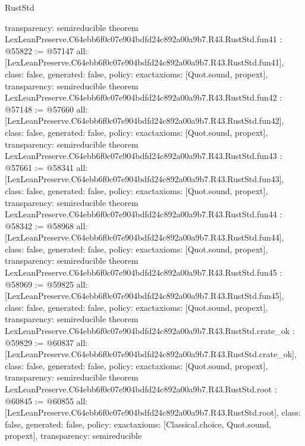\begin{lexlean}{RustStd}
\begin{coremodule}
{  transparency: semireducible
}
theorem LexLeanPreserve.C64ebb6f0c07e904bdfd24c892a00a9b7.R43.RustStd.fun41 : @55822 := @57147 {
  all: [LexLeanPreserve.C64ebb6f0c07e904bdfd24c892a00a9b7.R43.RustStd.fun41],
  class: false,
  generated: false,
  policy: exact{axioms: [Quot.sound, propext]},
  transparency: semireducible
}
theorem LexLeanPreserve.C64ebb6f0c07e904bdfd24c892a00a9b7.R43.RustStd.fun42 : @57148 := @57660 {
  all: [LexLeanPreserve.C64ebb6f0c07e904bdfd24c892a00a9b7.R43.RustStd.fun42],
  class: false,
  generated: false,
  policy: exact{axioms: [Quot.sound, propext]},
  transparency: semireducible
}
theorem LexLeanPreserve.C64ebb6f0c07e904bdfd24c892a00a9b7.R43.RustStd.fun43 : @57661 := @58341 {
  all: [LexLeanPreserve.C64ebb6f0c07e904bdfd24c892a00a9b7.R43.RustStd.fun43],
  class: false,
  generated: false,
  policy: exact{axioms: [Quot.sound, propext]},
  transparency: semireducible
}
theorem LexLeanPreserve.C64ebb6f0c07e904bdfd24c892a00a9b7.R43.RustStd.fun44 : @58342 := @58968 {
  all: [LexLeanPreserve.C64ebb6f0c07e904bdfd24c892a00a9b7.R43.RustStd.fun44],
  class: false,
  generated: false,
  policy: exact{axioms: [Quot.sound, propext]},
  transparency: semireducible
}
theorem LexLeanPreserve.C64ebb6f0c07e904bdfd24c892a00a9b7.R43.RustStd.fun45 : @58969 := @59825 {
  all: [LexLeanPreserve.C64ebb6f0c07e904bdfd24c892a00a9b7.R43.RustStd.fun45],
  class: false,
  generated: false,
  policy: exact{axioms: [Quot.sound, propext]},
  transparency: semireducible
}
theorem LexLeanPreserve.C64ebb6f0c07e904bdfd24c892a00a9b7.R43.RustStd.crate_ok : @59829 := @60837 {
  all: [LexLeanPreserve.C64ebb6f0c07e904bdfd24c892a00a9b7.R43.RustStd.crate_ok],
  class: false,
  generated: false,
  policy: exact{axioms: [Quot.sound, propext]},
  transparency: semireducible
}
theorem LexLeanPreserve.C64ebb6f0c07e904bdfd24c892a00a9b7.R43.RustStd.root : @60845 := @60855 {
  all: [LexLeanPreserve.C64ebb6f0c07e904bdfd24c892a00a9b7.R43.RustStd.root],
  class: false,
  generated: false,
  policy: exact{axioms: [Classical.choice, Quot.sound, propext]},
  transparency: semireducible
}


\end{coremodule}
\end{lexlean}
